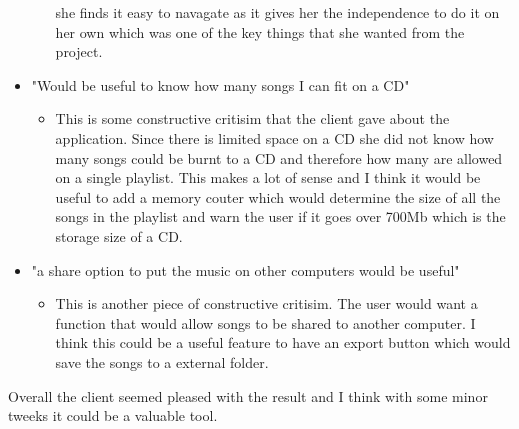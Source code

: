 \documentclass{article}
\begin{document}
\begin{itemize}
\begin{itemize}
            she finds it easy to navagate as it gives her the independence to do it on her
            own which was one of the key things that she wanted from the project.
    \end{itemize}
    \item "Would be useful to know how many songs I can fit on a CD"
    \begin{itemize}
        \item This is some constructive critisim that the client gave about the application.
            Since there is limited space on a CD she did not know how many songs could be burnt
            to a CD and therefore how many are allowed on a single playlist. This makes a lot of
            sense and I think it would be useful to add a memory couter which would determine
            the size of all the songs in the playlist and warn the user if it goes over 700Mb
            which is the storage size of a CD.
    \end{itemize}
    \item "a share option to put the music on other computers would be useful"
    \begin{itemize}
        \item This is another piece of constructive critisim. The user would want a function
            that would allow songs to be shared to another computer. I think this could be a
            useful feature to have an export button which would save the songs to a external
            folder.
    \end{itemize}
\end{itemize}

Overall the client seemed pleased with the result and I think with some minor tweeks it could
be a valuable tool.
\end{document}

